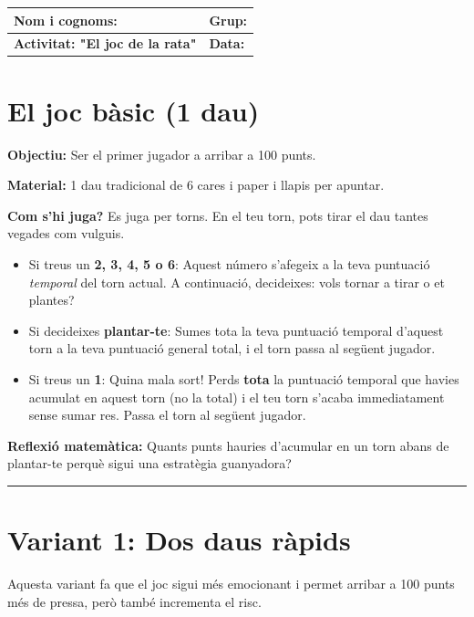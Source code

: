 \documentclass[12pt,a4paper]{article}
\begin{document}
\begingroup
\renewcommand{\arraystretch}{2.2}
\begin{tabularx}{\textwidth}{|X|p{4cm}|}
\hline
\textbf{Nom i cognoms:} & \textbf{Grup:} \\ \hline
\textbf{Activitat: "El joc de la rata"} & \textbf{Data:} \\ \hline
\end{tabularx}
\endgroup

\section*{El joc bàsic (1 dau)}

\textbf{ }

\textbf{Objectiu:} Ser el primer jugador a arribar a 100 punts.

\textbf{Material:} 1 dau tradicional de 6 cares i paper i llapis per apuntar.

\textbf{Com s'hi juga?}
Es juga per torns. En el teu torn, pots tirar el dau tantes vegades com vulguis.
\begin{itemize}
\item Si treus un \textbf{2, 3, 4, 5 o 6}: Aquest número s'afegeix a la teva puntuació \textit{temporal} del torn actual. A continuació, decideixes: vols tornar a tirar o et plantes?
\item Si decideixes \textbf{plantar-te}: Sumes tota la teva puntuació temporal d'aquest torn a la teva puntuació general total, i el torn passa al següent jugador.
\item Si treus un \textbf{1}: Quina mala sort! Perds \textbf{tota} la puntuació temporal que havies acumulat en aquest torn (no la total) i el teu torn s'acaba immediatament sense sumar res. Passa el torn al següent jugador.
\end{itemize}

\vspace{0.3cm}

\textbf{Reflexió matemàtica:} Quants punts hauries d'acumular en un torn abans de plantar-te perquè sigui una estratègia guanyadora?

\vspace{0.5cm}
\hrule
\vspace{0.5cm}

\section*{Variant 1: Dos daus ràpids}

Aquesta variant fa que el joc sigui més emocionant i permet arribar a 100 punts més de pressa, però també incrementa el risc.
\end{document}
